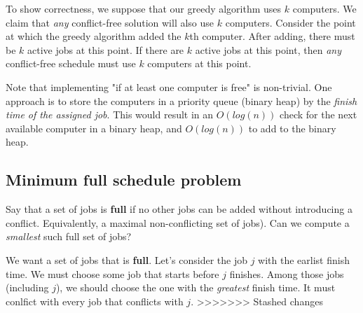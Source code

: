\documentclass[titlepage, 12pt, leqno]{article}
\begin{document}
To show correctness, we suppose that our greedy algorithm uses $k$ computers.
We claim that \textit{any} conflict-free solution will also use $k$ computers.
Consider the point at which the greedy algorithm added the $k$th computer. After
adding, there must be $k$ active jobs at this point. If there are $k$ active
jobs at this point, then \textit{any} conflict-free schedule must use $k$
computers at this point.

Note that implementing "if at least one computer is free" is non-trivial. One
approach is to store the computers in a priority queue (binary heap) by the
\textit{finish time of the assigned job}. This would result in an $O(log(n))$
check for the next available computer in a binary heap, and $O(log(n))$ to add
to the binary heap.

\subsection{Minimum full schedule problem}
Say that a set of jobs is \textbf{full} if no other jobs can be added without
introducing a conflict. Equivalently, a maximal non-conflicting set of jobs).
Can we compute a \textit{smallest} such full set of jobs? 

We want a set of jobs that is \textbf{full}. Let's consider the job $j$ with the
earlist finish time. We must choose some job that starts before $j$ finishes.
Among those jobs (including $j$), we should choose the one with the \textit{
greatest} finish time. It must conlfict with every job that conflicts with $j$.
>>>>>>> Stashed changes
\end{document}
